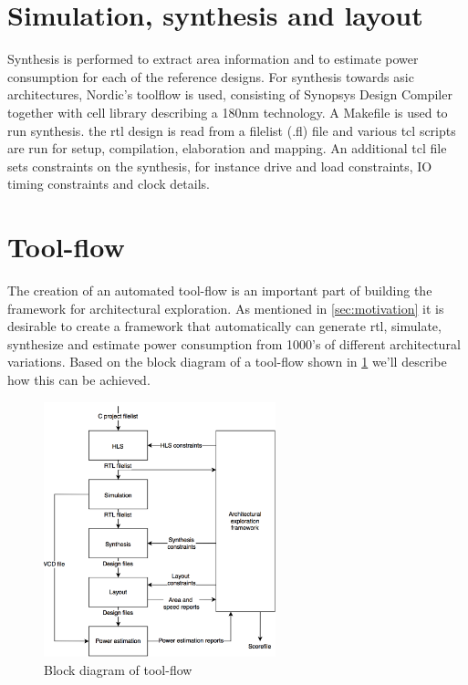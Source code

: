 \section{Simulation, synthesis and layout}
Synthesis is performed to extract area information and to estimate power consumption for each of the reference designs. For synthesis towards \gls{asic} architectures, Nordic's toolflow is used, consisting of Synopsys Design Compiler \cite{syndescomp} together with cell library describing a 180nm technology. A Makefile is used to run synthesis. the \gls{rtl} design is read from a filelist (.fl) file and various \gls{tcl} scripts are run for setup, compilation, elaboration and mapping. An additional \gls{tcl} file sets constraints on the synthesis, for instance drive and load constraints, IO timing constraints and clock details.
\section{Tool-flow}
The creation of an automated tool-flow is an important part of building the framework for architectural exploration.  As mentioned in \cref{sec:motivation} it is desirable to create a framework that automatically can generate \gls{rtl}, simulate, synthesize and estimate power consumption from 1000's of different architectural variations. Based on the block diagram of a tool-flow shown in \cref{fig:toolflowblock} we'll describe how this can be achieved. 
\begin{figure}[hbpt]
\centering
\includegraphics[width=0.6\textwidth]{../figs/Toolflow.png}
\caption{\label{fig:toolflowblock}Block diagram of tool-flow}
\end{figure}
